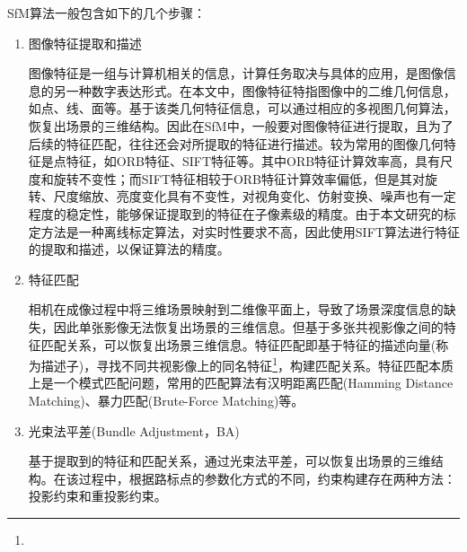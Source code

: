 SfM算法一般包含如下的几个步骤：
\begin{enumerate}
  \item 图像特征提取和描述

        图像特征是一组与计算机相关的信息，计算任务取决与具体的应用，是图像信息的另一种数字表达形式\cite{高翔2017视觉}。在本文中，图像特征特指图像中的二维几何信息，如点、线、面等。基于该类几何特征信息，可以通过相应的多视图几何算法，恢复出场景的三维结构。因此在SfM中，一般要对图像特征进行提取，且为了后续的特征匹配，往往还会对所提取的特征进行描述。较为常用的图像几何特征是点特征，如ORB特征\cite{rublee2011orb}、SIFT特征\cite{lowe2004distinctive}等。其中ORB特征计算效率高，具有尺度和旋转不变性；而SIFT特征相较于ORB特征计算效率偏低，但是其对旋转、尺度缩放、亮度变化具有不变性，对视角变化、仿射变换、噪声也有一定程度的稳定性，能够保证提取到的特征在子像素级的精度。由于本文研究的标定方法是一种离线标定算法，对实时性要求不高，因此使用SIFT算法进行特征的提取和描述，以保证算法的精度。

  \item 特征匹配

        相机在成像过程中将三维场景映射到二维像平面上，导致了场景深度信息的缺失，因此单张影像无法恢复出场景的三维信息。但基于多张共视影像之间的特征匹配关系，可以恢复出场景三维信息。特征匹配即基于特征的描述向量(称为描述子)，寻找不同共视影像上的同名特征\footnote{}，构建匹配关系。特征匹配本质上是一个模式匹配问题，常用的匹配算法有汉明距离匹配(Hamming Distance Matching)、暴力匹配(Brute-Force Matching)等。
  \item 光束法平差(Bundle Adjustment，BA)

        基于提取到的特征和匹配关系，通过光束法平差，可以恢复出场景的三维结构。在该过程中，根据路标点的参数化方式的不同，约束构建存在两种方法：投影约束和重投影约束。


\end{enumerate}
